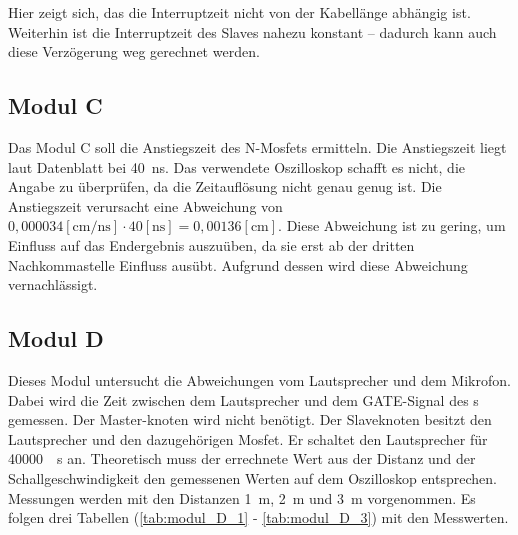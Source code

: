 Hier zeigt sich, das die Interruptzeit nicht von der Kabellänge abhängig ist. Weiterhin ist die Interruptzeit des Slaves nahezu konstant -- dadurch kann auch diese Verzögerung weg gerechnet werden.

\subsection{Modul C}
Das Modul C soll die Anstiegszeit des N-Mosfets ermitteln. Die Anstiegszeit liegt laut Datenblatt bei \SI{40}{\nano\s}. Das verwendete Oszilloskop schafft es nicht, die Angabe zu überprüfen, da die Zeitauflösung nicht genau genug ist. Die Anstiegszeit verursacht eine Abweichung von $\si{0,000034}[\si{\centi\m\per\nano\s}] \cdot \si{40} [\si{\nano\s}] = \si{0,00136} [\si{\centi\m}]$. Diese Abweichung ist zu gering, um Einfluss auf das Endergebnis auszuüben, da sie erst ab der dritten Nachkommastelle Einfluss ausübt. Aufgrund dessen wird diese Abweichung vernachlässigt.

\subsection{Modul D}
\label{sec:modul_D}
Dieses Modul untersucht die Abweichungen vom Lautsprecher und dem Mikrofon. Dabei wird die Zeit zwischen dem Lautsprecher und dem \si{GATE}-Signal des \microphone s \platz gemessen. Der Master-knoten wird nicht benötigt. Der Slaveknoten besitzt den Lautsprecher und den dazugehörigen Mosfet. Er schaltet den Lautsprecher für \SI{40000}{\mu\s} an. Theoretisch muss der errechnete Wert aus der Distanz und der Schallgeschwindigkeit den gemessenen Werten auf dem Oszilloskop entsprechen. Messungen werden mit den Distanzen \SI{1}{m}, \SI{2}{m} und \SI{3}{m} vorgenommen. Es folgen drei Tabellen (\ref{tab:modul_D_1} - \ref{tab:modul_D_3}) mit den Messwerten.

